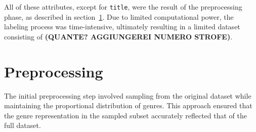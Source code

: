 All of these attributes, except for \texttt{title}, were the result
of the preprocessing phase, as described in section~\ref{preprocessing}.
Due to limited computational power, the labeling process was time-intensive,
ultimately resulting in a limited dataset consisting of
\textbf{(QUANTE? AGGIUNGEREI NUMERO STROFE)}.


\section{Preprocessing}
\label{preprocessing}
The initial preprocessing step involved sampling from the original dataset
while maintaining the proportional distribution of genres.
This approach ensured that the genre representation in the sampled subset
accurately reflected that of the full dataset.\\


